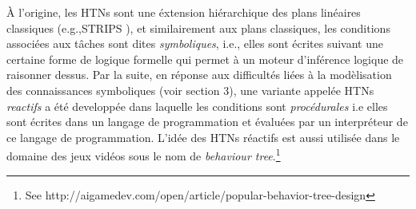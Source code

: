 \documentclass[a4paper,twoside,french]{article}
\begin{document}
				\`A l'origine, les HTNs sont une \'extension hi\'erarchique des plans lin\'eaires classiques (e.g.,STRIPS\cite{fikes1972strips} ), et similairement aux plans classiques, les conditions associ\'ees aux t\^aches sont dites \textit{symboliques}, i.e., elles sont \'ecrites suivant une certaine forme de logique formelle qui permet à un moteur d'inf\'erence logique de raisonner dessus. Par la suite, en r\'eponse aux difficult\'es li\'ees \`a la mod\`elisation des connaissances symboliques (voir section 3), une variante appel\'ee HTNs \textit{reactifs} a \'et\'e developp\'ee dans laquelle les conditions sont \textit{proc\'edurales} i.e elles sont \'ecrites dans un langage de programmation et \'evalu\'ees par un interpr\'eteur de ce langage de programmation. L'id\'ee des HTNs réactifs est aussi utilis\'ee dans le domaine des jeux vid\'eos sous le nom de \emph{behaviour tree}.\footnote{See http://aigamedev.com/open/article/popular-behavior-tree-design}
				
\end{document}
